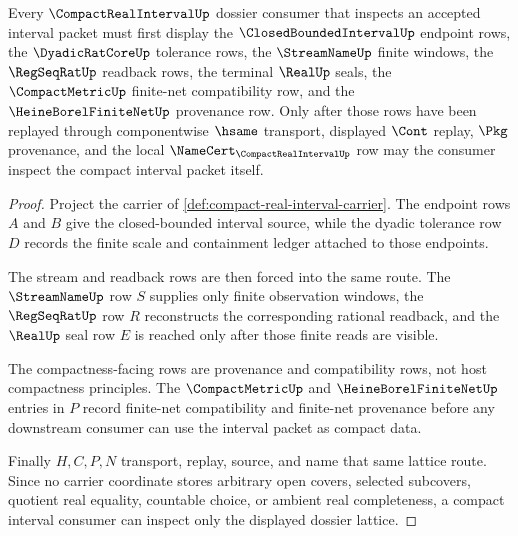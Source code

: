 \begin{theorem}
\label{thm:compact-real-interval-dossier-lattice-route}
Every $\CompactRealIntervalUp$ dossier consumer that inspects an accepted interval packet must first display the $\ClosedBoundedIntervalUp$ endpoint rows, the $\DyadicRatCoreUp$ tolerance rows, the $\StreamNameUp$ finite windows, the $\RegSeqRatUp$ readback rows, the terminal $\RealUp$ seals, the $\CompactMetricUp$ finite-net compatibility row, and the $\HeineBorelFiniteNetUp$ provenance row. Only after those rows have been replayed through componentwise $\hsame$ transport, displayed $\Cont$ replay, $\Pkg$ provenance, and the local $\NameCert_{\CompactRealIntervalUp}$ row may the consumer inspect the compact interval packet itself.
\end{theorem}
\begin{proof}
Project the carrier of \autoref{def:compact-real-interval-carrier}. The endpoint rows $A$ and $B$ give the closed-bounded interval source, while the dyadic tolerance row $D$ records the finite scale and containment ledger attached to those endpoints.

The stream and readback rows are then forced into the same route. The $\StreamNameUp$ row $S$ supplies only finite observation windows, the $\RegSeqRatUp$ row $R$ reconstructs the corresponding rational readback, and the $\RealUp$ seal row $E$ is reached only after those finite reads are visible.

The compactness-facing rows are provenance and compatibility rows, not host compactness principles. The $\CompactMetricUp$ and $\HeineBorelFiniteNetUp$ entries in $P$ record finite-net compatibility and finite-net provenance before any downstream consumer can use the interval packet as compact data.

Finally $H,C,P,N$ transport, replay, source, and name that same lattice route. Since no carrier coordinate stores arbitrary open covers, selected subcovers, quotient real equality, countable choice, or ambient real completeness, a compact interval consumer can inspect only the displayed dossier lattice.
\end{proof}
